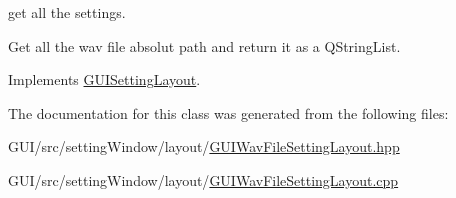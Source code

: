 get all the settings. 

Get all the wav file absolut path and return it as a Q\+String\+List. 

Implements \mbox{\hyperlink{class_g_u_i_setting_layout_aa1d7031225076febae3c7779fc82eeaa}{G\+U\+I\+Setting\+Layout}}.



The documentation for this class was generated from the following files\+:\begin{DoxyCompactItemize}
\item 
G\+U\+I/src/setting\+Window/layout/\mbox{\hyperlink{_g_u_i_wav_file_setting_layout_8hpp}{G\+U\+I\+Wav\+File\+Setting\+Layout.\+hpp}}\item 
G\+U\+I/src/setting\+Window/layout/\mbox{\hyperlink{_g_u_i_wav_file_setting_layout_8cpp}{G\+U\+I\+Wav\+File\+Setting\+Layout.\+cpp}}\end{DoxyCompactItemize}
